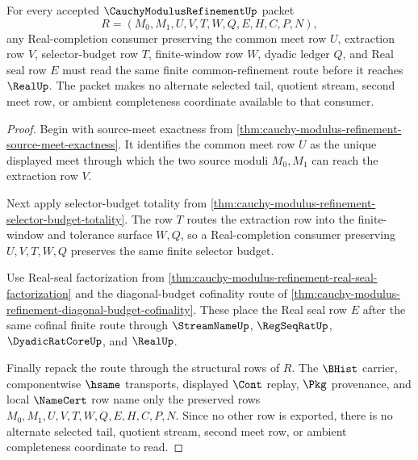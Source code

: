 \begin{theorem}
\label{thm:cauchy-modulus-refinement-common-refinement-selector-lock}
For every accepted $\CauchyModulusRefinementUp$ packet
$$
R=(M_0,M_1,U,V,T,W,Q,E,H,C,P,N),
$$
any Real-completion consumer preserving the common meet row $U$, extraction row $V$, selector-budget row $T$, finite-window row $W$, dyadic ledger $Q$, and Real seal row $E$ must read the same finite common-refinement route before it reaches $\RealUp$. The packet makes no alternate selected tail, quotient stream, second meet row, or ambient completeness coordinate available to that consumer.
\end{theorem}
\begin{proof}
Begin with source-meet exactness from \autoref{thm:cauchy-modulus-refinement-source-meet-exactness}. It identifies the common meet row $U$ as the unique displayed meet through which the two source moduli $M_0,M_1$ can reach the extraction row $V$.

Next apply selector-budget totality from \autoref{thm:cauchy-modulus-refinement-selector-budget-totality}. The row $T$ routes the extraction row into the finite-window and tolerance surface $W,Q$, so a Real-completion consumer preserving $U,V,T,W,Q$ preserves the same finite selector budget.

Use Real-seal factorization from \autoref{thm:cauchy-modulus-refinement-real-seal-factorization} and the diagonal-budget cofinality route of \autoref{thm:cauchy-modulus-refinement-diagonal-budget-cofinality}. These place the Real seal row $E$ after the same cofinal finite route through $\StreamNameUp$, $\RegSeqRatUp$, $\DyadicRatCoreUp$, and $\RealUp$.

Finally repack the route through the structural rows of $R$. The $\BHist$ carrier, componentwise $\hsame$ transports, displayed $\Cont$ replay, $\Pkg$ provenance, and local $\NameCert$ row name only the preserved rows $M_0,M_1,U,V,T,W,Q,E,H,C,P,N$. Since no other row is exported, there is no alternate selected tail, quotient stream, second meet row, or ambient completeness coordinate to read.
\end{proof}

